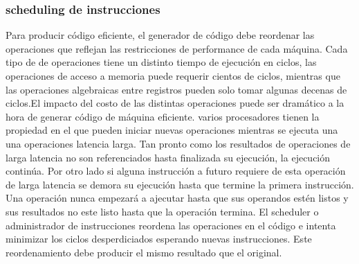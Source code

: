 \documentclass[fleqn]{tcdl}
\begin{document}
\subsubsection*{scheduling de instrucciones}

Para producir código eficiente, el generador de código debe reordenar las operaciones que reflejan las restricciones de performance de cada máquina. Cada tipo de de operaciones tiene un distinto tiempo de ejecución en ciclos, las operaciones de acceso a memoria puede requerir cientos de ciclos, mientras que las operaciones algebraicas entre registros pueden solo tomar algunas decenas de ciclos.El impacto del costo de las distintas operaciones puede ser dramático a la hora de generar código de máquina eficiente. varios procesadores tienen la propiedad en el que pueden iniciar nuevas operaciones mientras se ejecuta una una operaciones latencia larga. Tan pronto como los resultados de operaciones de larga latencia no son referenciados hasta finalizada su ejecución, la ejecución continúa. Por otro lado si alguna instrucción a futuro requiere de esta operación de larga latencia se demora su ejecución hasta que termine la primera instrucción. Una operación nunca empezará a ajecutar hasta que sus operandos estén listos y sus resultados no este listo hasta que la operación termina. El scheduler o administrador de instrucciones reordena las operaciones en el código e intenta minimizar los ciclos desperdiciados esperando nuevas instrucciones. Este reordenamiento debe producir el mismo resultado que el original.  
\end{document}
